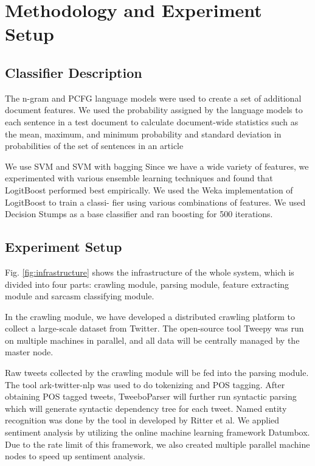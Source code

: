 \section{Methodology and Experiment Setup}
\label{sec:methodology}
\subsection{Classifier Description}
The n-gram and PCFG language models were used
to create a set of additional document features. We
used the probability assigned by the language models
to each sentence in a test document to calculate
document-wide statistics such as the mean, maximum,
and minimum probability and standard deviation
in probabilities of the set of sentences in an article

We use SVM \cite{libsvm} and SVM with bagging \cite{ensembleSVM}
Since we have a wide variety of features, we
experimented with various ensemble learning techniques
and found that LogitBoost performed best
empirically. We used the Weka implementation of LogitBoost \cite{Friedman98} to train a classi-
fier using various combinations of features. We used
Decision Stumps as a base classifier and ran boosting
for 500 iterations.

\subsection{Experiment Setup}

Fig. \ref{fig:infrastructure} shows the infrastructure of the whole system, which is divided into four parts: crawling module, parsing module, feature extracting module and sarcasm classifying module.

In the crawling module, we have developed a distributed crawling platform to collect a large-scale dataset from Twitter. The open-source tool Tweepy\cite{tweepy} was run on multiple machines in parallel, and all data will be centrally managed by the master node.

Raw tweets collected by the crawling module will be fed into the parsing module. The tool ark-twitter-nlp\cite{tweetnlp} was used to do tokenizing and POS tagging. After obtaining POS tagged tweets, TweeboParser\cite{kong2014dependency} will further run syntactic parsing which will generate syntactic dependency tree for each tweet. Named entity recognition was done by the tool in developed by Ritter et al\cite{Ritter11}\cite{Ritter12}. We applied sentiment analysis by utilizing the online machine learning framework Datumbox\cite{datumbox}. Due to the rate limit of this framework, we also created multiple parallel machine nodes to speed up sentiment analysis.

